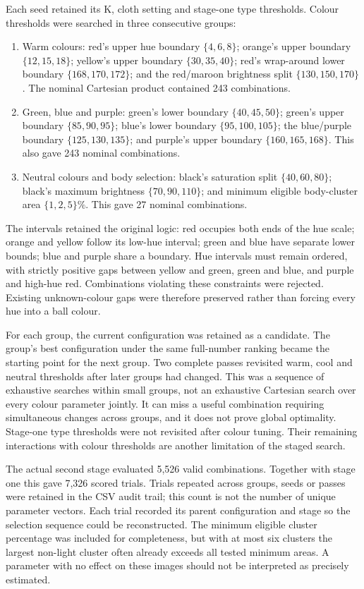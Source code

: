 Each seed retained its K, cloth setting and stage-one type thresholds.
Colour thresholds were searched in three consecutive groups:

\begin{enumerate}
\item Warm colours: red's upper hue boundary $\{4,6,8\}$;
orange's upper boundary $\{12,15,18\}$; yellow's upper boundary
$\{30,35,40\}$; red's wrap-around lower boundary
$\{168,170,172\}$; and the red/maroon brightness split
$\{130,150,170\}$. The nominal Cartesian product contained 243 combinations.
\item Green, blue and purple: green's lower boundary
$\{40,45,50\}$; green's upper boundary $\{85,90,95\}$;
blue's lower boundary $\{95,100,105\}$; the blue/purple boundary
$\{125,130,135\}$; and purple's upper boundary
$\{160,165,168\}$. This also gave 243 nominal combinations.
\item Neutral colours and body selection: black's saturation split
$\{40,60,80\}$; black's maximum brightness $\{70,90,110\}$;
and minimum eligible body-cluster area $\{1,2,5\}\%$.
This gave 27 nominal combinations.
\end{enumerate}

The intervals retained the original logic: red occupies both ends of the
hue scale; orange and yellow follow its low-hue interval; green and blue
have separate lower bounds; blue and purple share a boundary. Hue intervals
must remain ordered, with strictly positive gaps between yellow and green,
green and blue, and purple and high-hue red. Combinations violating these
constraints were rejected. Existing unknown-colour gaps were therefore
preserved rather than forcing every hue into a ball colour.

For each group, the current configuration was retained as a candidate. The
group's best configuration under the same full-number ranking became the
starting point for the next group. Two complete passes revisited warm,
cool and neutral thresholds after later groups had changed. This was a
sequence of exhaustive searches within small groups, not an exhaustive
Cartesian search over every colour parameter jointly. It can miss a useful
combination requiring simultaneous changes across groups, and it does not
prove global optimality. Stage-one type thresholds were not revisited after
colour tuning. Their remaining interactions with colour thresholds are
another limitation of the staged search.

The actual second stage evaluated 5,526 valid combinations. Together with
stage one this gave 7,326 scored trials. Trials repeated across groups,
seeds or passes were retained in the CSV audit trail; this count is not
the number of unique parameter vectors. Each trial recorded its parent
configuration and stage so the selection sequence could be reconstructed.
The minimum eligible cluster percentage was included for completeness, but
with at most six clusters the largest non-light cluster often already
exceeds all tested minimum areas. A parameter with no effect on these
images should not be interpreted as precisely estimated.

